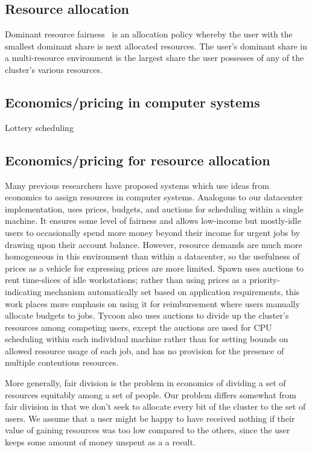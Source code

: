 \documentclass{acm_proc_article-sp}
\begin{document}
\subsection{Resource allocation}
Dominant resource fairness~\cite{drf} is an allocation policy whereby the user with the smallest dominant share is next allocated resources. The user's dominant share in a multi-resource environment is the largest share the user possesses of any of the cluster's various resources.

\subsection{Economics/pricing in computer systems}
Lottery scheduling

\subsection{Economics/pricing for resource allocation}
Many previous researchers have proposed systems which use ideas from economics
to assign resources in computer systems.  Analogous to our datacenter
implementation, \cite{stoica94} uses prices, budgets, and auctions for
scheduling within a single machine. It ensures some level of fairness and
allows low-income but mostly-idle users to occasionally spend more money beyond
their income for urgent jobs by drawing upon their account balance. However,
resource demands are much more homogeneous in this environment than within a
datacenter, so the usefulness of prices as a vehicle for expressing prices are
more limited. Spawn \cite{spawn} uses auctions to rent time-slices of idle
workstations; rather than using prices as a priority-indicating mechanism
automatically set based on application requirements, this work places more
emphasis on using it for reimbursement where users manually allocate budgets to
jobs. Tycoon \cite{tycoon} also uses auctions to divide up the cluster's
resources among competing users, except the auctions are used for CPU scheduling
within each individual machine rather than for setting bounds on allowed
resource usage of each job, and has no provision for the presence of
multiple contentious resources.

More generally, fair division is the problem in economics of dividing a set of
resources equitably among a set of people. Our problem differs somewhat from
fair division in that we don't seek to allocate every bit of the cluster to the
set of users. We assume that a user might be happy to have received nothing if
their value of gaining resources was too low compared to the others, since the
user keeps some amount of money unspent as a a result.
\end{document}
